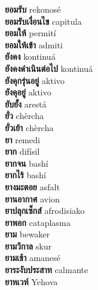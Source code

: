 \textbf{ ยอมรับ  } rekonosé \\
\textbf{ ยอมรับเงื่อนไข  } capitula \\
\textbf{ ยอมให้  } permití \\
\textbf{ ยอมให้เข้า  } admiti \\
\textbf{ ยังคง  } kontinuá \\
\textbf{ ยังคงดำเนินต่อไป  } kontinuá \\
\textbf{ ยังคุกรุ่นอยู่  } aktivo \\
\textbf{ ยังคุอยู่  } aktivo \\
\textbf{ ยับยั้ง  } arestá \\
\textbf{ ยั่ว  } chèrcha \\
\textbf{ ยั่วเย้า  } chèrcha \\
\textbf{ ยา  } remedi \\
\textbf{ ยาก  } difísil \\
\textbf{ ยากจน  } bashí \\
\textbf{ ยากไร้  } bashí \\
\textbf{ ยางมะตอย  } asfalt \\
\textbf{ ยานอากาศ  } avion \\
\textbf{ ยาปลุกเซ็กส์  } afrodisiako \\
\textbf{ ยาพอก  } cataplasma \\
\textbf{ ยาม  } bewaker \\
\textbf{ ยามวิกาล  } skur \\
\textbf{ ยามเช้า  } amanesé \\
\textbf{ ยาระงับประสาท  } calmante \\
\textbf{ ยาหเวห์  } Yehova \\
